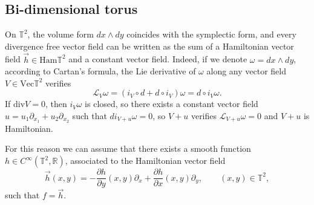 \documentclass[10pt]{article}
\newcommand{\p}{\partial}
\newcommand{\R}{{\mathbb R}}
\newcommand{\T}{{\mathbb T}}
\newcommand{\f}{\overrightarrow}
\newcommand{\we}{\wedge}
\begin{document}
\subsection{Bi-dimensional torus}

On $\T^2$, the volume form $dx \we dy$ coincides with the symplectic form, and every divergence free vector field  can be written as the sum of a Hamiltonian vector field $\f{h} \in \mathrm{Ham}\T^2$ and a constant vector field. Indeed, if we denote $\omega=dx \we dy$, according to Cartan's formula, the Lie derivative of $\omega$ along any vector field $V\in \mathrm{Vec}\T^2$ verifies
    \begin{equation*}
        \mathcal{L}_V\omega= (i_V\circ d + d \circ i_V)\omega=d\circ i_V\omega.
    \end{equation*}
    If $\mathrm{div}V=0$, then $i_V\omega$ is closed, so there exists a constant vector field $u=u_1\p_{x_1}+u_2\p_{x_2}$ such that $di_{V+u}\omega=0$, so $V+u$ verifies $\mathcal{L}_{V+u}\omega=0$ and $V+u$ is Hamiltonian.
    
For this reason we can assume that there exists a smooth function $h \in C^{\infty}(\T^2,\R)$, associated to the Hamiltonian vector field 
\begin{equation*}
    \f{h}(x,y)=-\frac{\p h}{\p y}(x,y)\p_x + \frac{\p h}{\p x}(x,y)\p_y, \qquad (x,y)\in \T^2,
\end{equation*}
such that $f=\f{h}$.
\end{document}
